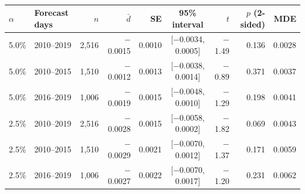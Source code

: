 \begin{table}[t]
\centering{}\footnotesize\setlength{\tabcolsep}{5pt}
\caption{}\label{tab:real-pair}
\begin{tabular}{llrrrcrrr}
\toprule
$\alpha$ & Forecast days & $n$ & $\bar d$ & SE & 95\% interval & $t$ & $p$ (2-sided) & MDE \\
\midrule
5.0\% & 2010--2019 & 2,516 & $-$0.0015 & 0.0010 & [$-$0.0034, 0.0005] & $-$1.49 & 0.136 & 0.0028 \\
5.0\% & 2010--2015 & 1,510 & $-$0.0012 & 0.0013 & [$-$0.0038, 0.0014] & $-$0.89 & 0.371 & 0.0037 \\
5.0\% & 2016--2019 & 1,006 & $-$0.0019 & 0.0015 & [$-$0.0048, 0.0010] & $-$1.29 & 0.198 & 0.0041 \\
2.5\% & 2010--2019 & 2,516 & $-$0.0028 & 0.0015 & [$-$0.0058, 0.0002] & $-$1.82 & 0.069 & 0.0043 \\
2.5\% & 2010--2015 & 1,510 & $-$0.0029 & 0.0021 & [$-$0.0070, 0.0012] & $-$1.37 & 0.171 & 0.0059 \\
2.5\% & 2016--2019 & 1,006 & $-$0.0027 & 0.0022 & [$-$0.0070, 0.0017] & $-$1.20 & 0.231 & 0.0062 \\
\bottomrule
\end{tabular}
\end{table}
